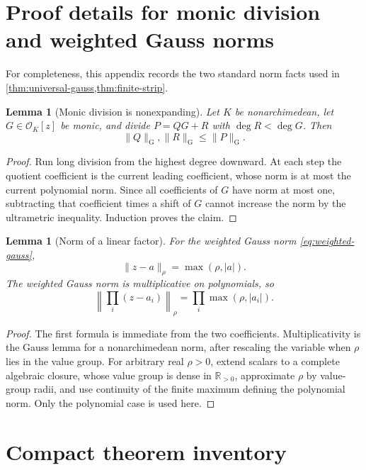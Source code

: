 \documentclass[11pt,oneside]{article}
\newtheorem{lemma}[theorem]{Lemma}
\theoremstyle{definition}
\begin{document}
\section{Proof details for monic division and weighted Gauss norms}
\label{app:gauss-details}

For completeness, this appendix records the two standard norm facts used in
\cref{thm:universal-gauss,thm:finite-strip}.

\begin{lemma}[Monic division is nonexpanding]\label{lem:monic-division}
Let $K$ be nonarchimedean, let $G\in\mathcal O_K[z]$ be monic, and divide
$P=QG+R$ with $\deg R<\deg G$.  Then
\[
 \lVert Q\rVert_{\mathrm G},\lVert R\rVert_{\mathrm G}
 \le\lVert P\rVert_{\mathrm G}.
\]
\end{lemma}

\begin{proof}
Run long division from the highest degree downward.  At each step the quotient coefficient is
the current leading coefficient, whose norm is at most the current polynomial norm.  Since
all coefficients of $G$ have norm at most one, subtracting that coefficient times a shift of
$G$ cannot increase the norm by the ultrametric inequality.  Induction proves the claim.
\end{proof}

\begin{lemma}[Norm of a linear factor]\label{lem:linear-factor-norm}
For the weighted Gauss norm \eqref{eq:weighted-gauss},
\[
 \lVert z-a\rVert_\rho=\max(\rho,|a|).
\]
The weighted Gauss norm is multiplicative on polynomials, so
\[
 \left\lVert\prod_i(z-a_i)\right\rVert_\rho
 =\prod_i\max(\rho,|a_i|).
\]
\end{lemma}

\begin{proof}
The first formula is immediate from the two coefficients.  Multiplicativity is the Gauss
lemma for a nonarchimedean norm, after rescaling the variable when $\rho$ lies in the value
group.  For arbitrary real $\rho>0$, extend scalars to a complete algebraic closure, whose
value group is dense in $\mathbb R_{>0}$, approximate $\rho$ by value-group radii, and use
continuity of the finite maximum defining the polynomial norm.  Only the polynomial case is
used here.
\end{proof}

\section{Compact theorem inventory}
\label{app:inventory}
\end{document}
